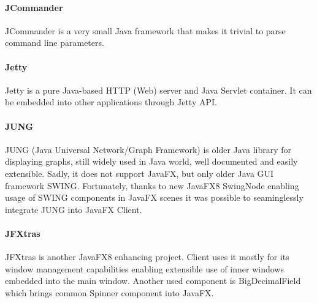


\paragraph{JCommander}
JCommander is a very small Java framework that makes it trivial to parse command
line parameters.

\paragraph{Jetty}
Jetty is a pure Java-based HTTP (Web) server and Java Servlet container. It can
be embedded into other applications through Jetty API.

\paragraph{JUNG}
JUNG (Java Universal Network/Graph Framework) is older Java library for
displaying graphs, still widely used in Java world, well documented and easily
extensible. Sadly, it does not support JavaFX, but only older Java GUI framework
SWING. Fortunately, thanks to new JavaFX8 SwingNode enabling usage of SWING
components in JavaFX scenes it was possible to seaminglessly integrate JUNG into
JavaFX \textan{} Client.

\paragraph{JFXtras}
JFXtras is another JavaFX8 enhancing project. \textan{} Client uses it mostly for
its window management capabilities enabling extensible use of inner windows
embedded into the main window. Another used component is BigDecimalField which
brings common Spinner component into JavaFX.

